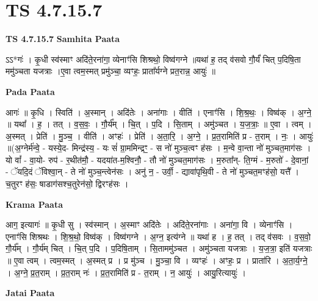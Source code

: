 \documentclass[17pt]{extarticle}
\begin{document}
\section{ TS 4.7.15.7 }

\textbf{TS 4.7.15.7 } \newline
\textbf{Samhita Paata} \newline

ऽऽ*गः॑ । कृ॒धी स्व॑स्माꣳ अदि॑ते॒रना॑गा॒ व्येनाꣳ॑सि शिश्रथो॒ विष्व॑गग्ने ॥यथा॑ ह॒ तद् व॑सवो गौ॒र्यं॑ चित् प॒दिषि॒ता ममु॑ञ्चता यजत्राः ।ए॒वा त्वम॒स्मत् प्रमु॑ञ्चा॒ व्यꣳहः॒ प्राता᳚र्यग्ने प्रत॒रान्न॒ आयुः॑ ॥ \newline

\textbf{Pada Paata} \newline

आगः॑ ॥ कृ॒धि । स्विति॑ । अ॒स्मान् । अदि॑तेः । अना॑गाः । वीति॑ । एनाꣳ॑सि । शि॒श्र॒थः॒ । विष्व॑क् । अ॒ग्ने॒ ॥ यथा᳚ । ह॒ । तत् । व॒स॒वः॒ । गौ॒र्य᳚म् । चि॒त् । प॒दि । सि॒ताम् । अमु॑ञ्चत । य॒ज॒त्राः॒ ॥ ए॒वा । त्वम् । अ॒स्मत् । प्रेति॑ । मु॒ञ्च॒ । वीति॑ । अꣳहः॑ । प्रेति॑ । अ॒ता॒रि॒ । अ॒ग्ने॒ । प्र॒त॒रामिति॑ प्र - त॒राम् । नः॒ । आयुः॑ ॥(अ॒ग्नेर्म॑न्वे॒ - यस्ये॒द- मिन्द्र॑स्य॒ - यः सं॑ ग्रा॒ममिन्द्रꣳ॒॒ - स नो॑ मुञ्च॒त्वꣳ ह॑सः । म॒न्वे वा॒न्ता नो॑ मुञ्चत॒माग॑सः । यो वां᳚ - वा॒यो- रुप॑ - र॒थीत॑मौ॒ - यदया॑त-म॒श्विनौ॒ - तौ नो॑ मुञ्चत॒माग॑सः । म॒रुता᳚न्- ति॒ग्मं - म॒रुतो॑ - दे॒वानां॒ - ॅयदि॒दं ॅविश्वा॒न् - ते नो॑ मुञ्च॒न्त्वेन॑सः । अनु॑ न॒ - उर्वी॒ - द्यावा॑पृथि॒वी - ते नो॑ मुञ्चत॒मꣳह॑सो॒ यत्तै᳚ । च॒तुरꣳ ह॑सः॒ षाडाग॑सश्च॒तुरेन॑सो॒ द्विरꣳह॑सः ।  \newline


\textbf{Krama Paata} \newline

आग॒ इत्यागः॑ ॥ कृ॒धी सु । स्व॑स्मान् । अ॒स्माꣳ अदि॑तेः । अदि॑ते॒रना॑गाः । अना॑गा॒ वि । व्येनाꣳ॑सि । एनाꣳ॑सि शिश्रथः । शि॒श्र॒थो॒ विष्व॑क् । विष्व॑गग्ने । अ॒ग्न॒ इत्य॑ग्ने ॥ यथा॑ ह । ह॒ तत् । तद् व॑सवः । व॒स॒वो॒ गौ॒र्य᳚म् । गौ॒र्य॑म् चित् । चि॒त् प॒दि । प॒दिषि॒ताम् । सि॒ताममु॑ञ्चत । अमु॑ञ्चता यजत्राः । य॒ज॒त्रा॒ इति॑ यजत्राः ॥ ए॒वा त्वम् । त्वम॒स्मत् । अ॒स्मत् प्र । प्र मु॑ञ्च । मु॒ञ्चा॒ वि । व्यꣳहः॑ । अꣳहः॒ प्र । प्राता॑रि । अ॒ता॒र्य॒ग्ने॒ । अ॒ग्ने॒ प्र॒त॒राम् । प्र॒त॒राम् नः॑ । प्र॒त॒रामिति॑ प्र - त॒राम् । न॒ आयुः॑ । आयु॒रित्यायुः॑ । \newline

\textbf{Jatai Paata} \newline
\end{document}
